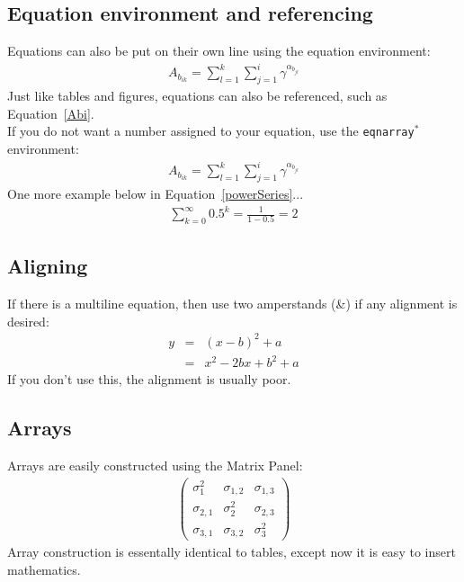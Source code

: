 \documentclass[11pt]{article} %
\begin{document}
\subsection{Equation environment and referencing}

Equations can also be put on their own line using the equation environment:
\begin{eqnarray}
A_{b_{ik}} %
	= \sum_{l=1}^{k}\sum_{j=1}^{i} \gamma^{\alpha_{b_{jl}}}
\label{Abi}
\end{eqnarray}
Just like tables and figures, equations can also be referenced, such as Equation~\ref{Abi}. \\

If you do not want a number assigned to your equation, use the \texttt{eqnarray$^*$} environment:
\begin{eqnarray*}
A_{b_{ik}} = \sum_{l=1}^{k}\sum_{j=1}^{i} \gamma^{\alpha_{b_{jl}}}
\end{eqnarray*}
One more example below in Equation~\ref{powerSeries}...
\begin{eqnarray}
\sum_{k=0}^{\infty}0.5^k = \frac{1}{1-0.5} = 2
\label{powerSeries}
\end{eqnarray}


\subsection{Aligning}

If there is a multiline equation, then use two amperstands (\&) if any alignment is desired:
\begin{eqnarray*}
y &=& (x-b)^2 + a \\ %
&=& x^2 - 2bx + b^2 + a %
\end{eqnarray*}
If you don't use this, the alignment is usually poor.

\subsection{Arrays}

Arrays are easily constructed using the Matrix Panel:
\begin{eqnarray*}
\left(
	\begin{array}{ccc}
	\sigma_1^2 & \sigma_{1,2} & \sigma_{1,3} \\
	\sigma_{2,1} & \sigma_{2}^2 & \sigma_{2,3} \\
	\sigma_{3,1} & \sigma_{3,2} & \sigma_{3}^2
	\end{array}
\right)
\end{eqnarray*}
Array construction is essentally identical to tables, except now it is easy to insert mathematics.
\end{document}
